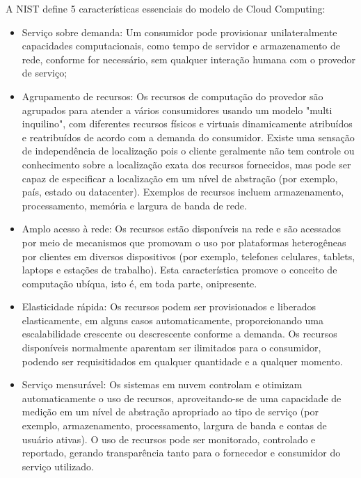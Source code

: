 A NIST define 5 características essenciais do modelo de Cloud Computing:
\begin{itemize}
	\item Serviço sobre demanda: Um consumidor pode provisionar unilateralmente capacidades computacionais, como tempo de servidor e armazenamento de rede, conforme for necessário, sem qualquer interação humana com o provedor de serviço;
	\item Agrupamento de recursos: Os recursos de computação do provedor são agrupados para atender a vários consumidores usando um modelo "multi inquilino", com diferentes recursos físicos e virtuais dinamicamente atribuídos e reatribuídos de acordo com a demanda do consumidor. Existe uma sensação de independência de localização pois o cliente geralmente não tem controle ou conhecimento sobre a localização exata dos recursos fornecidos, mas pode ser capaz de especificar a localização em um nível de abstração (por exemplo, país, estado ou datacenter). Exemplos de recursos incluem armazenamento, processamento, memória e largura de banda de rede.
	\item Amplo acesso à rede: Os recursos estão disponíveis na rede e são acessados por meio de mecanismos que promovam o uso por plataformas heterogêneas por clientes em diversos dispositivos (por exemplo, telefones celulares, tablets, laptops e estações de trabalho). Esta característica promove o conceito de computação ubíqua, isto é, em toda parte, onipresente.
	\item Elasticidade rápida: Os recursos podem ser provisionados e liberados elasticamente, em alguns casos automaticamente, proporcionando uma escalabilidade crescente ou descrescente conforme a demanda. Os recursos disponíveis normalmente aparentam ser ilimitados para o consumidor, podendo ser requisitidados em qualquer quantidade e a qualquer momento.
	\item Serviço mensurável: Os sistemas em nuvem controlam e otimizam automaticamente o uso de recursos, aproveitando-se de uma capacidade de medição em um nível de abstração apropriado ao tipo de serviço (por exemplo, armazenamento, processamento, largura de banda e contas de usuário ativas). O uso de recursos pode ser monitorado, controlado e reportado, gerando transparência tanto para o fornecedor e consumidor do serviço utilizado.
\end{itemize}
